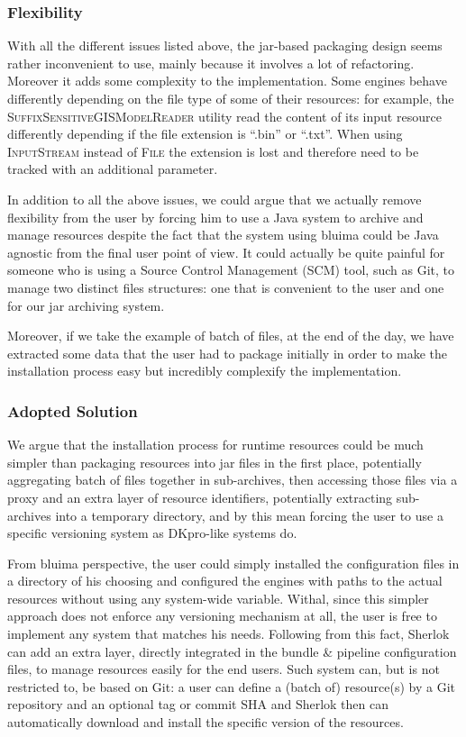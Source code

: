 \documentclass{article}
\newcommand{\ID}[1]{{\textsc{#1}}}
\begin{document}
\subsubsection{Flexibility}

With all the different issues listed above, the jar-based packaging design seems rather inconvenient
to use, mainly because it involves a lot of refactoring. Moreover it adds some complexity to the
implementation. Some engines behave differently depending on the file type of some of their
resources: for example, the \ID{SuffixSensitiveGISModelReader} utility read the content of its input
resource differently depending if the file extension is ``.bin'' or ``.txt''. When using
\ID{InputStream} instead of \ID{File} the extension is lost and therefore need to be tracked with an
additional parameter.

In addition to all the above issues, we could argue that we actually remove flexibility from the
user by forcing him to use a Java system to archive and manage resources despite the fact that the
system using bluima could be Java agnostic from the final user point of view. It could actually be
quite painful for someone who is using a Source Control Management (SCM) tool, such as Git, to
manage two distinct files structures: one that is convenient to the user and one for our jar
archiving system.

Moreover, if we take the example of batch of files, at the end of the day, we have extracted some
data that the user had to package initially in order to make the installation process easy but
incredibly complexify the implementation.


\subsubsection{Adopted Solution}

We argue that the installation process for runtime resources could be much simpler than packaging
resources into jar files in the first place, potentially aggregating batch of files together in
sub-archives, then accessing those files via a proxy and an extra layer of resource identifiers,
potentially extracting sub-archives into a temporary directory, and by this mean forcing the user to
use a specific versioning system as DKpro-like systems do.

From bluima perspective, the user could simply installed the configuration files in a directory of
his choosing and configured the engines with paths to the actual resources without using any
system-wide variable. Withal, since this simpler approach does not enforce any versioning mechanism
at all, the user is free to implement any system that matches his needs. Following from this fact,
Sherlok can add an extra layer, directly integrated in the bundle \& pipeline configuration files, to
manage resources easily for the end users. Such system can, but is not restricted to, be based on
Git: a user can define a (batch of) resource(s) by a Git repository and an optional tag or commit
SHA and Sherlok then can automatically download and install the specific version of the resources.
\end{document}
